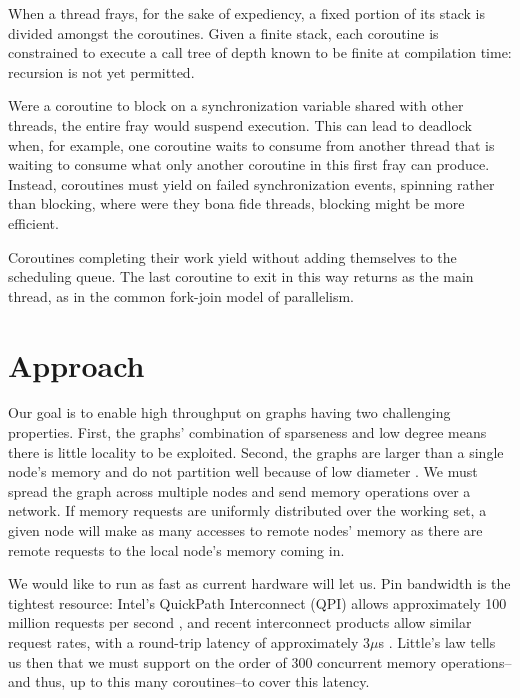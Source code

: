 \documentclass{acm_proc_article-sp}
\begin{document}

When a thread frays, for the sake of expediency, a fixed portion of
its stack is divided amongst the coroutines.  Given a finite stack,
each coroutine is constrained to execute a call tree of depth known to
be finite at compilation time: recursion is not yet permitted.

 Were a coroutine to
block on a synchronization variable shared with other threads, the
entire fray would suspend execution.  This can lead to deadlock when,
for example, one coroutine waits to consume from another thread that
is waiting to consume what only another coroutine in this first fray
can produce.  Instead, coroutines must yield on failed synchronization
events, spinning rather than blocking, where were they bona fide
threads, blocking might be more efficient.


Coroutines completing their work yield without adding themselves to
the scheduling queue.  The last coroutine to exit in this way returns
as the main thread, as in the common  fork-join model of parallelism.


\section{Approach}
\label{sec:approach}

Our goal is to enable high throughput on graphs having two challenging
properties. First, the graphs' combination of sparseness and low
degree means there is little locality to be exploited. Second, the
graphs are larger than a single node's memory and do not partition
well because of low diameter . We must spread the graph across multiple nodes
and send memory operations over a network. If memory requests are
uniformly distributed over the working set, a given node will make as
many accesses to remote nodes' memory as there are remote requests to the local node's memory coming in.

We would like to run as fast as current hardware will let us. Pin
bandwidth is the tightest resource: Intel's QuickPath Interconnect
(QPI) allows approximately 100 million requests per second
\cite{quickpath:website} , and recent interconnect products allow similar request
rates, with a round-trip latency of approximately 3$\mu$s
. Little's law tells us then that we must support on the
order of 300 concurrent memory operations--and thus, up to this many coroutines--to
cover this latency.
\end{document}
